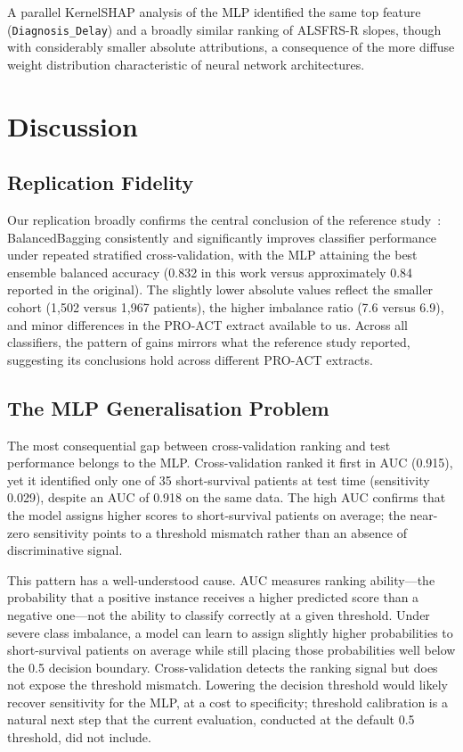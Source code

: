 \documentclass[a4paper,twoside]{article}
\begin{document}
A parallel KernelSHAP analysis of the MLP identified the same top feature
(\texttt{Diagnosis\_Delay}) and a broadly similar ranking of ALSFRS-R slopes,
though with considerably smaller absolute attributions, a consequence of the
more diffuse weight distribution characteristic of neural network architectures.


\section{Discussion}
\label{sec:discussion}

\subsection{Replication Fidelity}

Our replication broadly confirms the central conclusion of the reference
study~\cite{Papaiz2024}: BalancedBagging consistently and significantly improves
classifier performance under repeated stratified cross-validation, with the MLP
attaining the best ensemble balanced accuracy (0.832 in this work versus
approximately 0.84 reported in the original). The slightly lower absolute values reflect the smaller cohort (1,502 versus
1,967 patients), the higher imbalance ratio (7.6 versus 6.9), and minor
differences in the PRO-ACT extract available to us. Across all classifiers,
the pattern of gains mirrors what the reference study reported, suggesting its
conclusions hold across different PRO-ACT extracts.

\subsection{The MLP Generalisation Problem}

The most consequential gap between cross-validation ranking and test performance
belongs to the MLP. Cross-validation ranked it first in AUC (0.915), yet it
identified only one of 35 short-survival patients at test time (sensitivity
0.029), despite an AUC of 0.918 on the same data. The high AUC confirms that
the model assigns higher scores to short-survival patients on average; the
near-zero sensitivity points to a threshold mismatch rather than an absence of
discriminative signal.

This pattern has a well-understood cause. AUC measures ranking ability---the
probability that a positive instance receives a higher predicted score than a
negative one---not the ability to classify correctly at a given threshold. Under
severe class imbalance, a model can learn to assign slightly higher probabilities
to short-survival patients on average while still placing those probabilities well
below the 0.5 decision boundary. Cross-validation detects the ranking signal but does not expose the threshold
mismatch. Lowering the decision threshold would likely recover sensitivity for
the MLP, at a cost to specificity; threshold calibration is a natural next step
that the current evaluation, conducted at the default 0.5 threshold, did not
include.
\end{document}
